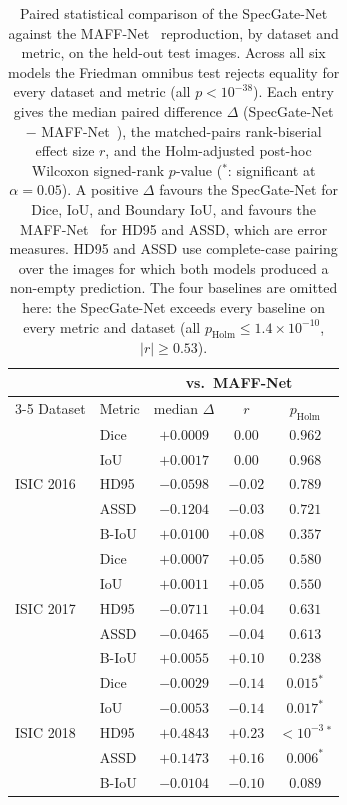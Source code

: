 \begin{table}[!t]
\centering
\caption{Paired statistical comparison of the SpecGate-Net against the MAFF-Net~\cite{ref15} reproduction, by dataset and metric, on the held-out test images. Across all six models the Friedman omnibus test rejects equality for every dataset and metric (all $p<10^{-38}$). Each entry gives the median paired difference $\Delta$ (SpecGate-Net $-$ MAFF-Net~\cite{ref15}), the matched-pairs rank-biserial effect size $r$, and the Holm-adjusted post-hoc Wilcoxon signed-rank $p$-value ($^{*}$: significant at $\alpha=0.05$). A positive $\Delta$ favours the SpecGate-Net for Dice, IoU, and
Boundary IoU, and favours the MAFF-Net~\cite{ref15} for HD95 and ASSD, which are
error measures. HD95 and ASSD use complete-case pairing over the images for
which both models produced a non-empty prediction. The four baselines are
omitted here: the SpecGate-Net exceeds every baseline on every metric and dataset (all $p_{\mathrm{Holm}}\le 1.4\times10^{-10}$, $\lvert r\rvert\ge 0.53$).}
\label{tab:stats}
\setlength{\tabcolsep}{6pt}
\footnotesize
\begin{tabular}{llccc}
\toprule
 & & \multicolumn{3}{c}{vs.\ MAFF-Net~\cite{ref15}} \\
\cmidrule(lr){3-5}
Dataset & Metric & median $\Delta$ & $r$ & $p_{\mathrm{Holm}}$ \\
\midrule
\multirow{5}{*}{ISIC 2016}
 & Dice  & $+0.0009$ & $0.00$  & $0.962$ \\
 & IoU   & $+0.0017$ & $0.00$  & $0.968$ \\
 & HD95  & $-0.0598$ & $-0.02$ & $0.789$ \\
 & ASSD  & $-0.1204$ & $-0.03$ & $0.721$ \\
 & B-IoU & $+0.0100$ & $+0.08$ & $0.357$ \\
\midrule
\multirow{5}{*}{ISIC 2017}
 & Dice  & $+0.0007$ & $+0.05$ & $0.580$ \\
 & IoU   & $+0.0011$ & $+0.05$ & $0.550$ \\
 & HD95  & $-0.0711$ & $+0.04$ & $0.631$ \\
 & ASSD  & $-0.0465$ & $-0.04$ & $0.613$ \\
 & B-IoU & $+0.0055$ & $+0.10$ & $0.238$ \\
\midrule
\multirow{5}{*}{ISIC 2018}
 & Dice  & $-0.0029$ & $-0.14$ & $0.015^{*}$        \\
 & IoU   & $-0.0053$ & $-0.14$ & $0.017^{*}$        \\
 & HD95  & $+0.4843$ & $+0.23$ & $<\!10^{-3}\,^{*}$ \\
 & ASSD  & $+0.1473$ & $+0.16$ & $0.006^{*}$        \\
 & B-IoU & $-0.0104$ & $-0.10$ & $0.089$            \\
\bottomrule
\end{tabular}
\end{table}


